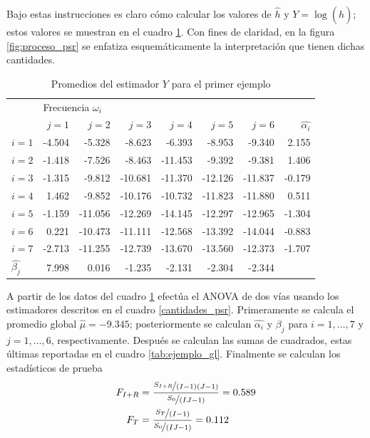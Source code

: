 \documentclass[12pt,letterpaper]{book}
\begin{document}
Bajo estas instrucciones es claro cómo calcular los valores de
$\widehat{h}$ y
$Y = \log\left( \widehat{h} \right)$; estos valores se muestran en el cuadro \ref{tab:valores_psr}.
%
Con fines de claridad, en la figura \ref{fig:proceso_psr} se enfatiza esquemáticamente la interpretación que tienen 
dichas cantidades.

\begin{table}
\caption{Promedios del estimador $Y$ para el primer ejemplo}
\centering
\begin{tabular}{lrrrrrrr}
\toprule
      & \multicolumn{6}{l}{Frecuencia $\omega_i$} \\
\cmidrule{2-7}
      & $j=1$  & $j=2$   & $j=3$   & $j=4$   & $j=5$   & $j=6$   & $\widehat{\alpha_i}$ \\ 
\midrule
$i=1$ & -4.504 & -5.328  & -8.623  & -6.393  & -8.953  & -9.340  & 2.155  \\
$i=2$ & -1.418 & -7.526  & -8.463  & -11.453 & -9.392  & -9.381  & 1.406  \\
$i=3$ & -1.315 & -9.812  & -10.681 & -11.370 & -12.126 & -11.837 & -0.179 \\
$i=4$ & 1.462  & -9.852  & -10.176 & -10.732 & -11.823 & -11.880 & 0.511  \\
$i=5$ & -1.159 & -11.056 & -12.269 & -14.145 & -12.297 & -12.965 & -1.304 \\
$i=6$ & 0.221  & -10.473 & -11.111 & -12.568 & -13.392 & -14.044 & -0.883 \\
$i=7$ & -2.713 & -11.255 & -12.739 & -13.670 & -13.560 & -12.373 & -1.707 \\
$\widehat{\beta_j}$
      & 7.998  & 0.016   & -1.235  & -2.131  & -2.304  & -2.344  & 
      \\ 
\bottomrule
\end{tabular}
\label{tab:valores_psr}
\end{table}

A partir de los datos del cuadro \ref{tab:valores_psr} efectúa el ANOVA de dos vías usando los estimadores descritos en el cuadro \ref{cantidades_psr}.
%
Primeramente se calcula el promedio global $\widehat{\mu} = -9.345$;
posteriormente se calculan $\widehat{\alpha_i}$ y $\beta_j$ para $i=1,\dots, 7$ y $j=1,\dots, 6$, respectivamente. 
%
Después se calculan las sumas de cuadrados, estas últimas reportadas en el cuadro \ref{tab:ejemplo_gl}.
%
Finalmente se calculan los estadísticos de prueba
\begin{align}
F_{I+R} &= \frac{\nicefrac{S_{I+R}}{(I-1)(J-1)}}{\nicefrac{S_0}{(IJ-1)}} = 0.589 \\
F_{T} &= \frac{\nicefrac{S_{T}}{(I-1)}}{\nicefrac{S_0}{(IJ-1)}} = 0.112
\end{align}
\end{document}
